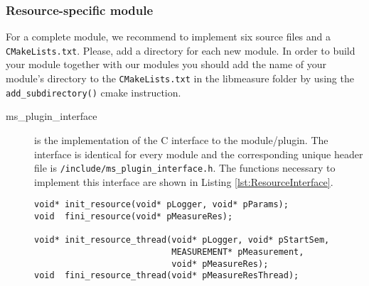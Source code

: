 \subsubsection{Resource-specific module}
For a complete module, we recommend to implement six source files and a \texttt{CMakeLists.txt}. Please, add a directory for each new module. In order to build your module together with our modules you should add the name of your module's directory to the \texttt{CMakeLists.txt} in the libmeasure folder by using the \texttt{add\_subdirectory()} cmake instruction.
\begin{description}
	\item[ms\_plugin\_interface] is the implementation of the C interface to the module/plugin. The interface is identical for every module and the corresponding unique header file is \texttt{/include/ms\_plugin\_interface.h}. The functions necessary to implement this interface are shown in Listing \ref{lst:ResourceInterface}.
	
	\begin{lstlisting}[caption={Interface that each plugin must implement.\added[id=ck]{Listing aktualisiert.}}, label=lst:ResourceInterface]
void* init_resource(void* pLogger, void* pParams);
void  fini_resource(void* pMeasureRes);

void* init_resource_thread(void* pLogger, void* pStartSem,
						   MEASUREMENT* pMeasurement,
						   void* pMeasureRes);
void  fini_resource_thread(void* pMeasureResThread);


\end{lstlisting}
\end{description}
